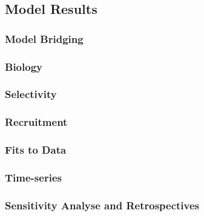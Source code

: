 \documentclass[
]{scrartcl}
\let\origfigure\figure
\let\endorigfigure\endfigure
\renewenvironment{figure}[1][2] {
    \expandafter\origfigure\expandafter[H]
} {
    \endorigfigure
}
\begin{document}
\newpage

\subsection{Model Results}\label{model-results}

\subsubsection{Model Bridging}\label{model-bridging}

\subsubsection{Biology}\label{biology-1}

\subsubsection{Selectivity}\label{selectivity}

\subsubsection{Recruitment}\label{recruitment-1}

\subsubsection{Fits to Data}\label{fits-to-data}

\subsubsection{Time-series}\label{time-series}

\begin{figure}


\caption{\label{fig-sb}}

\end{figure}%

\newpage

\subsubsection{Sensitivity Analyse and
Retrospectives}\label{sensitivity-analyse-and-retrospectives}
\end{document}
